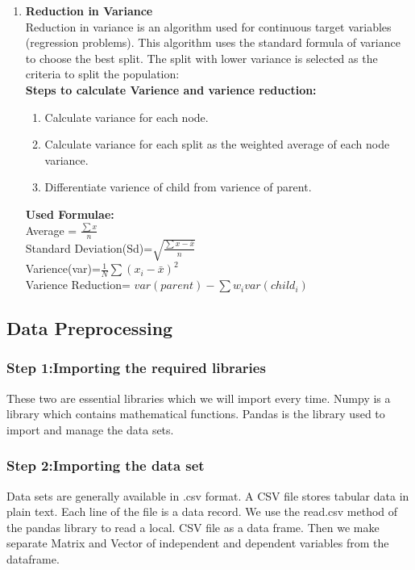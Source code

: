 \begin{enumerate}
\item \textbf{Reduction in Variance}\\
Reduction in variance is an algorithm used for continuous target variables (regression problems). This algorithm uses the standard formula of variance to choose the best split. The split with lower variance is selected as the criteria to split the population:\\
\textbf{Steps to calculate Varience and varience reduction:}\\
\vspace{-18pt}
\begin{enumerate}
\item Calculate variance for each node.
\item Calculate variance for each split as the weighted average of each node variance.
\item Differentiate varience of child from varience of parent. 
\end{enumerate}
\textbf{Used Formulae:}\\
Average = $\frac{\sum{x}}{n}$\\
Standard Deviation(Sd)=$\sqrt{\frac{\sum{x-\bar{x}}}{n} }$\\
Varience(var)=$\frac{1}{N}\sum{\left( {x_i - \bar x} \right)^2 } $\\
Varience Reduction= $var(parent)-\sum{w_i var(child_i)}$\\



\end{enumerate}

\subsection{Data Preprocessing}
\subsubsection{Step 1:Importing the required libraries}
These two are essential libraries which we will import every time.
Numpy is a library which contains mathematical functions.
Pandas is the library used to import and manage the data sets. 

\subsubsection{Step 2:Importing the data set}
Data sets are generally available in .csv format. A CSV file stores tabular data in plain text. Each line of the file is a data record. We use the read.csv method of the pandas library to read a local. CSV file as a data frame. Then we make separate Matrix and Vector of independent and dependent variables from the dataframe.

